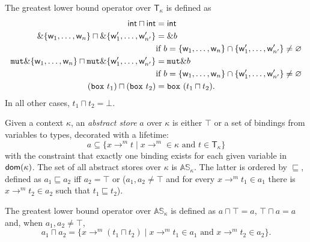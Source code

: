\begin{definition}
  The greatest lower bound operator over $\mathsf{T}_\kappa$ is defined as
  \begin{align*}
    \mathsf{int}\sqcap\mathsf{int} &= \mathsf{int}\\
    \borrow\{\mathsf{w}_1,\ldots,\mathsf{w}_n\} \sqcap \borrow\{\mathsf{w}'_1,\ldots,\mathsf{w}'_{n'}\} &= \borrow b\\
    & \text{if $b=\{\mathsf{w}_1,\ldots,\mathsf{w}_n\}\cap\{\mathsf{w}'_1,\ldots,\mathsf{w}'_{n'}\}\not=\varnothing$}\\
    \mathtt{mut}\borrow\{\mathsf{w}_1,\ldots,\mathsf{w}_n\} \sqcap \mathtt{mut}\borrow\{\mathsf{w}'_1,\ldots,\mathsf{w}'_{n'}\} &= \mathtt{mut}\borrow b\\
    & \text{if $b=\{\mathsf{w}_1,\ldots,\mathsf{w}_n\}\cap\{\mathsf{w}'_1,\ldots,\mathsf{w}'_{n'}\}\not=\varnothing$}\\
    (\mathtt{box}\ t_1) \sqcap (\mathtt{box}\ t_2) &=\mathtt{box}\ (t_1\sqcap t_2).
  \end{align*}
  In all other cases, $t_1\sqcap t_2=\bot$.
\end{definition}

\begin{definition}
  \label{def:abstract-store}
  Given a context $\kappa$, an \emph{abstract store} $a$ over $\kappa$ is either $\top$
  or a set of bindings from variables to types, decorated with a lifetime:
  \[
  a\subseteq\{x\to^m t\mid x\to^m\in\kappa\text{ and }t\in\mathsf{T_\kappa}\}
  \]
  with the constraint that exactly one binding exists for each given variable in $\mathsf{dom}(\kappa)$.
  The set of all abstract stores over $\kappa$ is $\mathbb{AS}_\kappa$.
  The latter is ordered by $\sqsubseteq$, defined as $a_1\sqsubseteq a_2$ iff $a_2=\top$ or
  ($a_1,a_2\not=\top$ and for every $x\to^mt_1\in a_1$ there is $x\to^mt_2\in a_2$
  such that $t_1\sqsubseteq t_2$).
\end{definition}

\begin{definition}
  The greatest lower bound operator over $\mathbb{AS}_\kappa$ is defined as
  $a\sqcap\top=a$, $\top\sqcap a=a$ and, when $a_1,a_2\not=\top$,
  \[
  a_1\sqcap a_2=\{x\to^m(t_1\sqcap t_2)\mid x\to^m t_1\in a_1\text{ and }x\to^m t_2\in a_2\}.
  \]
\end{definition}

